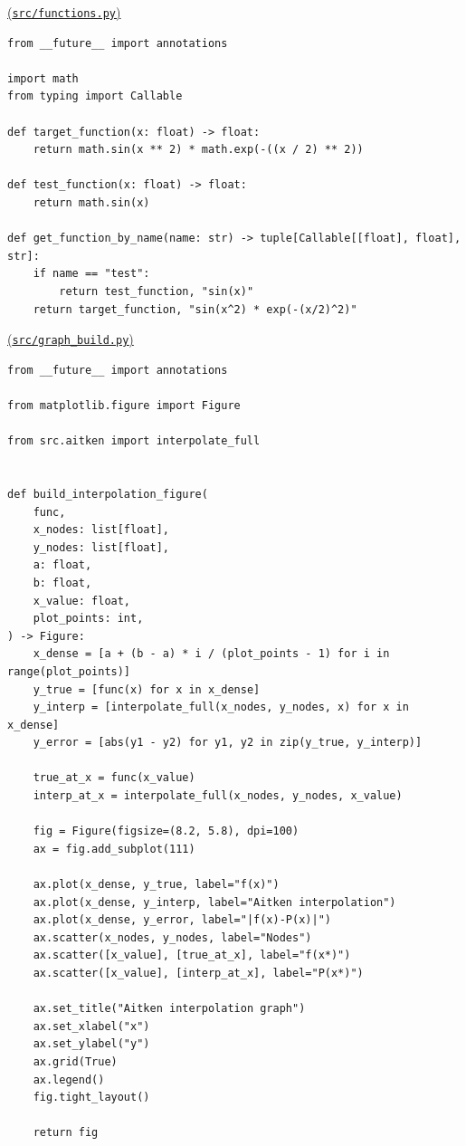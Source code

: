 \documentclass[12pt,a4paper]{article}
\begin{document}
    \noindent
    \underline{(\texttt{src/functions.py})}

    \begin{verbatim}
from __future__ import annotations

import math
from typing import Callable

def target_function(x: float) -> float:
    return math.sin(x ** 2) * math.exp(-((x / 2) ** 2))

def test_function(x: float) -> float:
    return math.sin(x)

def get_function_by_name(name: str) -> tuple[Callable[[float], float], str]:
    if name == "test":
        return test_function, "sin(x)"
    return target_function, "sin(x^2) * exp(-(x/2)^2)"
    \end{verbatim}

    \noindent
    \underline{(\texttt{src/graph\_build.py})}

    \begin{verbatim}
from __future__ import annotations

from matplotlib.figure import Figure

from src.aitken import interpolate_full


def build_interpolation_figure(
    func,
    x_nodes: list[float],
    y_nodes: list[float],
    a: float,
    b: float,
    x_value: float,
    plot_points: int,
) -> Figure:
    x_dense = [a + (b - a) * i / (plot_points - 1) for i in range(plot_points)]
    y_true = [func(x) for x in x_dense]
    y_interp = [interpolate_full(x_nodes, y_nodes, x) for x in x_dense]
    y_error = [abs(y1 - y2) for y1, y2 in zip(y_true, y_interp)]

    true_at_x = func(x_value)
    interp_at_x = interpolate_full(x_nodes, y_nodes, x_value)

    fig = Figure(figsize=(8.2, 5.8), dpi=100)
    ax = fig.add_subplot(111)

    ax.plot(x_dense, y_true, label="f(x)")
    ax.plot(x_dense, y_interp, label="Aitken interpolation")
    ax.plot(x_dense, y_error, label="|f(x)-P(x)|")
    ax.scatter(x_nodes, y_nodes, label="Nodes")
    ax.scatter([x_value], [true_at_x], label="f(x*)")
    ax.scatter([x_value], [interp_at_x], label="P(x*)")

    ax.set_title("Aitken interpolation graph")
    ax.set_xlabel("x")
    ax.set_ylabel("y")
    ax.grid(True)
    ax.legend()
    fig.tight_layout()

    return fig
    \end{verbatim}
\end{document}

